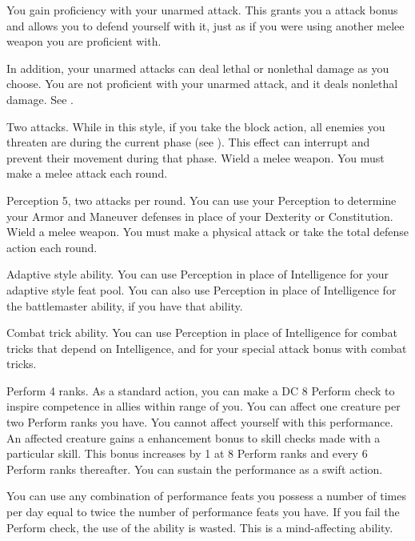 \featben You gain proficiency with your unarmed attack.
This grants you a  attack bonus and allows you to defend yourself with it, just as if you were using another melee weapon you are proficient with.

In addition, your unarmed attacks can deal lethal or nonlethal damage as you choose.
 You are not proficient with your unarmed attack, and it deals nonlethal damage. See .

\featpre Two attacks.
\featben While in this style, if you take the block action, all enemies you threaten are \immobilized during the current phase (see ).
This effect can interrupt and prevent their movement during that phase.
\stylereq Wield a melee weapon.
You must make a melee attack each round.

\featpres Perception 5, two attacks per round.
\featben You can use your Perception to determine your Armor and Maneuver defenses in place of your Dexterity or Constitution.
\stylereq Wield a melee weapon.
You must make a physical attack or take the total defense action each round.

\featpre Adaptive style ability.
\featben You can use Perception in place of Intelligence for your adaptive style feat pool.
You can also use Perception in place of Intelligence for the battlemaster ability, if you have that ability.

\featpre Combat trick ability.
\featben You can use Perception in place of Intelligence for combat tricks that depend on Intelligence, and for your special attack bonus with combat tricks.

\featpre Perform 4 ranks.
\featben As a standard action, you can make a DC 8 Perform check to inspire competence in allies within \rngmed range of you.
You can affect one creature per two Perform ranks you have.
You cannot affect yourself with this performance.
An affected creature gains a  enhancement bonus to skill checks made with a particular skill.
This bonus increases by 1 at 8 Perform ranks and every 6 Perform ranks thereafter.
You can sustain the performance as a swift action.

You can use any combination of performance feats you possess a number of times per day equal to twice the number of performance feats you have.
If you fail the Perform check, the use of the ability is wasted.
This is a mind-affecting ability.

